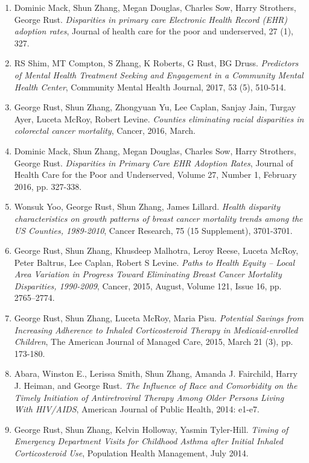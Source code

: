 \documentclass[letterpaper,11pt]{article}
\begin{document}
\begin{itemize}[leftmargin=0.15in, label={}]
{{\begin{enumerate}
    \item Dominic Mack, Shun Zhang, Megan Douglas, Charles Sow, Harry Strothers, George Rust. \textit{Disparities in primary care Electronic Health Record (EHR) adoption rates}, Journal of health care for the poor and underserved, 27 (1), 327.
    \item RS Shim, MT Compton, S Zhang, K Roberts, G Rust, BG Druss. \textit{Predictors of Mental Health Treatment Seeking and Engagement in a Community Mental Health Center}, Community Mental Health Journal, 2017, 53 (5), 510-514.
    \item George Rust, Shun Zhang, Zhongyuan Yu, Lee Caplan, Sanjay Jain, Turgay Ayer, Luceta McRoy, Robert Levine. \textit{Counties eliminating racial disparities in colorectal cancer mortality}, Cancer, 2016, March.
    \item Dominic Mack, Shun Zhang, Megan Douglas, Charles Sow, Harry Strothers, George Rust. \textit{Disparities in Primary Care EHR Adoption Rates}, Journal of Health Care for the Poor and Underserved, Volume 27, Number 1, February 2016, pp. 327-338.
    \item Wonsuk Yoo, George Rust, Shun Zhang, James Lillard. \textit{Health disparity characteristics on growth patterns of breast cancer mortality trends among the US Counties, 1989-2010}, Cancer Research, 75 (15 Supplement), 3701-3701.
    \item George Rust, Shun Zhang, Khusdeep Malhotra, Leroy Reese, Luceta McRoy, Peter Baltrus, Lee Caplan, Robert S Levine. \textit{Paths to Health Equity – Local Area Variation in Progress Toward Eliminating Breast Cancer Mortality Disparities, 1990-2009}, Cancer, 2015, August, Volume 121, Issue 16, pp. 2765–2774.
    \item George Rust, Shun Zhang, Luceta McRoy, Maria Pisu. \textit{Potential Savings from Increasing Adherence to Inhaled Corticosteroid Therapy in Medicaid-enrolled Children}, The American Journal of Managed Care, 2015, March 21 (3), pp. 173-180.
    \item Abara, Winston E., Lerissa Smith, Shun Zhang, Amanda J. Fairchild, Harry J. Heiman, and George Rust. \textit{The Influence of Race and Comorbidity on the Timely Initiation of Antiretroviral Therapy Among Older Persons Living With HIV/AIDS}, American Journal of Public Health, 2014: e1-e7.
    \item George Rust, Shun Zhang, Kelvin Holloway, Yasmin Tyler-Hill. \textit{Timing of Emergency Department Visits for Childhood Asthma after Initial Inhaled Corticosteroid Use}, Population Health Management, July 2014.

\end{enumerate}}}
\end{itemize}
\end{document}
